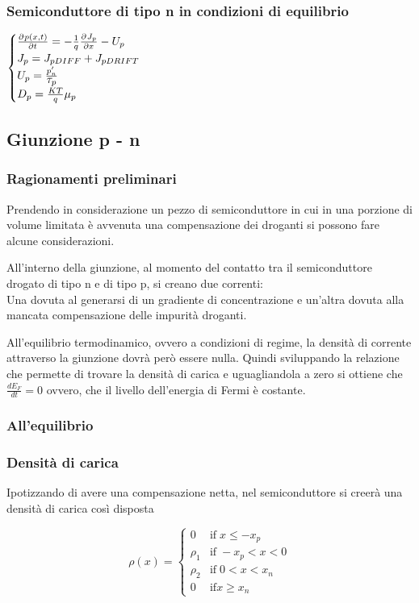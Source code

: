 \documentclass[12pt,a4paper]{article}
\newcommand{\pdv}[3]{\frac{\partial^{#2} #1}{\partial #3^{#2}}}
\newcommand{\Tau}{ \mathlarger{\mathlarger{ \tau }}}
\newcommand{\eqlist}[4]{ 
	\subsubsection*{#1}
	\parbox{19cm}{#2}
	
	\begin{equation}
	#3
	\end{equation}
	\noindent\parbox{19cm}{#4}}
\begin{document}
		\subsubsection{Semiconduttore di tipo \textbf{n} in condizioni di equilibrio}
		
		$\begin{cases}
			\pdv{p(x,t)}{}{t} = - \frac{1}{q} \pdv{J_{p}}{}{x} - U_{p}  \\ 
			J_{p} = J_{pDIFF}+J_{pDRIFT} \\
			U_{p}=\frac{p_{n}'}{\Tau_{p}} \\
			D_{p}=\frac{KT}{q} \mu_{p} \\
		\end{cases}$

	\subsection{Giunzione p - n }
		
		\subsubsection{Ragionamenti preliminari}
		Prendendo in considerazione un pezzo di semiconduttore in cui in una porzione di volume limitata è avvenuta una compensazione dei droganti si possono fare alcune considerazioni.
		
		All'interno della giunzione, al momento del contatto tra il semiconduttore drogato di tipo n e di tipo p, si creano due correnti: \\
		Una dovuta al generarsi di un gradiente di concentrazione e un'altra dovuta alla mancata compensazione delle impurità droganti.
		
		All'equilibrio termodinamico, ovvero a condizioni di regime, la densità di corrente attraverso la giunzione dovrà però essere nulla.
		Quindi sviluppando la relazione che permette di trovare la densità di carica e uguagliandola a zero si ottiene che $ \frac{dE_{F}}{dt} = 0 $ ovvero, che il livello dell'energia di Fermi è costante.
		
		\subsubsection{All'equilibrio}
		\eqlist{Densità di carica}
		{Ipotizzando di avere una compensazione netta, nel semiconduttore si creerà una densità di carica così disposta}
		{\rho(x) = \begin{cases} 
				0 & \mbox{if}\; x \leq -x_{p} \\
				\rho_{1} &\mbox{if}\; -x_{p} < x < 0 \\
				\rho_{2} &\mbox{if}\; 0 < x < x_{n} \\
				0 &\mbox{if} x \geq x_{n} \end{cases}}
	 	{}
		
\end{document}
